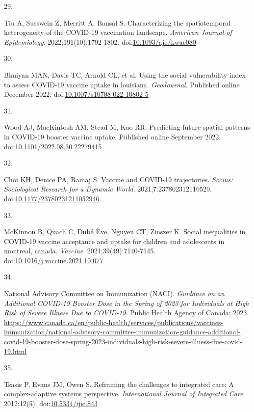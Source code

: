 \documentclass[
]{article}
\newlength{\cslhangindent}
\newlength{\csllabelwidth}
\newlength{\cslentryspacingunit} %
\newenvironment{CSLReferences}[2] %
 {%
  \setlength{\parindent}{0pt}
  \ifodd #1
  \let\oldpar\par
  \def\par{\hangindent=\cslhangindent\oldpar}
  \fi
  \setlength{\parskip}{#2\cslentryspacingunit}
 }%
 {}
\newcommand{\CSLLeftMargin}[1]{\parbox[t]{\csllabelwidth}{#1}}
\newcommand{\CSLRightInline}[1]{\parbox[t]{\linewidth - \csllabelwidth}{#1}\break}
\begin{document}
\begin{CSLReferences}{0}{0}
\leavevmode{}%
\CSLLeftMargin{29. }%
\CSLRightInline{Tiu A, Susswein Z, Merritt A, Bansal S. Characterizing
the spatiotemporal heterogeneity of the {COVID}-19 vaccination
landscape. \emph{American Journal of Epidemiology}.
2022;191(10):1792-1802.
doi:\href{https://doi.org/10.1093/aje/kwac080}{10.1093/aje/kwac080}}

\leavevmode{}%
\CSLLeftMargin{30. }%
\CSLRightInline{Bhuiyan MAN, Davis TC, Arnold CL, et al. Using the
social vulnerability index to assess {COVID}-19 vaccine uptake in
louisiana. \emph{{GeoJournal}}. Published online December 2022.
doi:\href{https://doi.org/10.1007/s10708-022-10802-5}{10.1007/s10708-022-10802-5}}

\leavevmode{}%
\CSLLeftMargin{31. }%
\CSLRightInline{Wood AJ, MacKintosh AM, Stead M, Kao RR. Predicting
future spatial patterns in {COVID}-19 booster vaccine uptake. Published
online September 2022.
doi:\href{https://doi.org/10.1101/2022.08.30.22279415}{10.1101/2022.08.30.22279415}}

\leavevmode{}%
\CSLLeftMargin{32. }%
\CSLRightInline{Choi KH, Denice PA, Ramaj S. Vaccine and {COVID}-19
trajectories. \emph{Socius: Sociological Research for a Dynamic World}.
2021;7:237802312110529.
doi:\href{https://doi.org/10.1177/23780231211052946}{10.1177/23780231211052946}}

\leavevmode{}%
\CSLLeftMargin{33. }%
\CSLRightInline{McKinnon B, Quach C, Dubé Ève, Nguyen CT, Zinszer K.
Social inequalities in {COVID}-19 vaccine acceptance and uptake for
children and adolescents in montreal, canada. \emph{Vaccine}.
2021;39(49):7140-7145.
doi:\href{https://doi.org/10.1016/j.vaccine.2021.10.077}{10.1016/j.vaccine.2021.10.077}}

\leavevmode{}%
\CSLLeftMargin{34. }%
\CSLRightInline{National Advisory Committee on Immunization (NACI).
\emph{Guidance on an Additional COVID-19 Booster Dose in the Spring of
2023 for Individuals at High Risk of Severe Illness Due to COVID-19}.
Public Health Agency of Canada; 2023.
\url{https://www.canada.ca/en/public-health/services/publications/vaccines-immunization/national-advisory-committee-immunization-guidance-additional-covid-19-booster-dose-spring-2023-individuals-high-risk-severe-illness-due-covid-19.html}}

\leavevmode{}%
\CSLLeftMargin{35. }%
\CSLRightInline{Tsasis P, Evans JM, Owen S. Reframing the challenges to
integrated care: A complex-adaptive systems perspective.
\emph{International Journal of Integrated Care}. 2012;12(5).
doi:\href{https://doi.org/10.5334/ijic.843}{10.5334/ijic.843}}


\end{CSLReferences}
\end{document}
